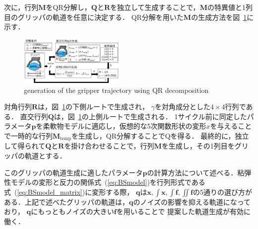 \documentclass[a4paper]{jarticle}
\begin{document}
次に，行列$\mathbf{M}$をQR分解し，$\mathbf{Q}$と$\mathbf{R}$を独立して生成することで，$\mathbf{M}$の特異値と1列目のグリッパの軌道を任意に決定する．
QR分解を用いた$\mathbf{M}$の生成方法を図~\ref{fig:QR_traj}に示す．
\begin{figure}[htbp]
    \centering
    \includegraphics[width=0.45\textwidth]{QR_traj.pdf}
    \captionsetup{width=0.9\linewidth} %
    \caption{generation of the gripper trajectory using QR decomposition}
    \label{fig:QR_traj}
\end{figure}
対角行列$\mathbf{R}$は，図~\ref{fig:QR_traj}の下側ルートで生成され，
$\gamma$を対角成分とした$4\times4$行列である．
直交行列$\mathbf{Q}$は，図~\ref{fig:QR_traj}の上側ルートで生成される．
1サイクル前に同定したパラメータ$\mathbf{p}$を柔軟物モデルに適応し，仮想的な5次関数形状の変形$x$を与えることで一時的な行列$\mathbf{M}_{\mathrm{temp}}$を生成し，QR分解することでQを得る．
最終的に，独立して得られて$\mathbf{Q}$と$\mathbf{R}$を掛け合わせることで，行列$\mathbf{M}$を生成し，その1列目をグリッパの軌道とする．

このグリッパの軌道生成に適したパラメータ$\mathbf{p}$の計算方法について述べる．粘弾性モデルの変形と反力の関係式~(\ref{eq:BSmodel})を行列形式である式~(\ref{eq:BSmodel_matrix})に変形する際，
$\mathbf{q}$は$\boldsymbol{x} , \int{\boldsymbol{x}} , \int{\boldsymbol{f}} , \iint{\boldsymbol{f}}$の5通りの選び方がある．上記で述べたグリッパの軌道は，$\mathbf{q}$のノイズの影響を抑える軌道になっており，
$\mathbf{q}$にもっともノイズの大きい$\boldsymbol{f}$を用いることで
提案した軌道生成が有効に働く．

\end{document}

